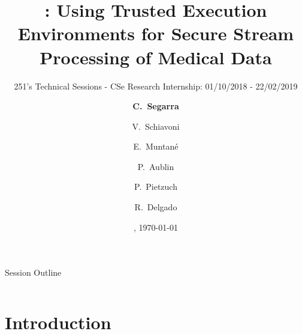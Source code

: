 \documentclass[10pt,    %
    english,            %
    xcolor=table,       %
    envcountsect,        %
    aspectratio=169     %
]{beamer}
\title[\projName:~Secure Streaming] %
    {\projName: Using Trusted Execution Environments for Secure Stream Processing of Medical Data}
\subtitle{251's Technical Sessions - CSe Research Internship: 01/10/2018 - 22/02/2019} %
\date[Wednesday, March 6th] %
    {\datedayname, \today}
\author[] %
{\textbf{C.~Segarra}\inst{1} \and V.~Schiavoni\inst{2} \and E.~Muntan\'e\inst{1} \and P.~Aublin\inst{3} \and P.~Pietzuch\inst{3} \and R.~Delgado\inst{1}}
\institute[] %
{\inst{1} CSEM, Neuch\^atel, Switzerland, \texttt{\{first.last\}@csem.ch} \and
\inst{2} University of Neuch\^atel, Switzerland, \texttt{valerio.schiavoni@unine.ch} \and
\inst{3} Imperial College London, United Kingdom, \texttt{\{p.aublin,prp\}@imperial.ac.uk}
}
\begin{document}
\begin{frame}
  \titlepage
\end{frame}

\begin{frame}{Session Outline}
    \begin{columns}[T,onlytextwidth]
        \begin{column}{.48\textwidth}
            \tableofcontents[sections={1-2}]
        \end{column}
        \begin{column}{.48\textwidth}
            \tableofcontents[sections={3-5}]
        \end{column}
    \end{columns}
\end{frame}

\section{Introduction}
\label{sec:introduction}
\sectionframe
\end{document}
